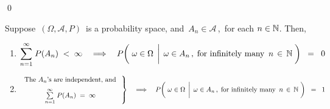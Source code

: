 \qed


\begin{theorem}\label{theorem:BorelCantelli}
\mbox{}\vskip 0.1cm
\noindent
Suppose \,$(\Omega,\mathcal{A},P)$\, is a probability space, and
\,$A_{n} \in \mathcal{A}$\,,\, for each $n \in \mathbb{N}$.
Then,
\begin{enumerate}
\item
	\begin{equation*}
	\overset{\infty}{\underset{n=1}{\sum}}\;P(A_{n}) \; < \; \infty
	\quad\Longrightarrow\quad
		P\!\left(\,
			\left.
			\omega \in \overset{{\color{white}-}}{\Omega}
			\,\;\right\vert\;
			\omega \in A_{n}\,,\;\textnormal{for infinitely many \,$n\,\in\,\N$}
			\;\right)
		\;\; = \;\; 0
	\end{equation*}
\item
	\begin{equation*}
	\left.\begin{array}{c}
		\underset{{\color{white}-}}{\textnormal{The $A_{n}$'s are independent, and}}
		\\
	\overset{\infty}{\underset{n=1}{\sum}}\;P(A_{n}) \; = \; \infty
	\end{array}\;\right\}
	\quad\Longrightarrow\quad
		P\!\left(\,
			\left.
			\omega \in \overset{{\color{white}-}}{\Omega}
			\,\;\right\vert\;
			\omega \in A_{n}\,,\;\textnormal{for infinitely many \,$n\,\in\,\N$}
			\;\right)
		\;\; = \;\; 1
	\end{equation*}
\end{enumerate}
\end{theorem}
\proof
